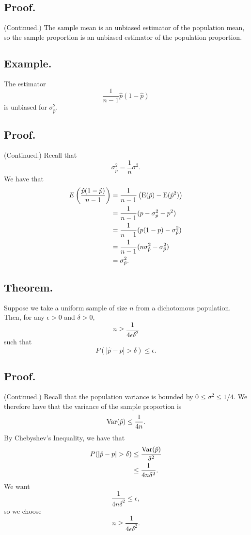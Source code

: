 \documentclass[titlepage]{article}
\begin{document}
\subsection{Proof.} (Continued.) The sample mean is an unbiased estimator of the population mean, so the sample proportion is an unbiased estimator of the population proportion.

\subsection{Example.} The estimator 
$$\frac{1}{n-1}\hat{p}(1-\hat{p})$$
is unbiased for $\sigma_{\hat{p}}^{2}$.

\subsection{Proof.} (Continued.) Recall that 
$$\sigma_{\hat{p}}^{2} = \frac{1}{n}\sigma^{2}.$$
We have that 
\begin{align*}
    E\left(\frac{\hat{p}(1-\hat{p})}{n-1}\right) &= \frac{1}{n-1}\left(\text{E}(\hat{p}) - \text{E}(\hat{p}^{2})\right) \\
                                                 &= \frac{1}{n-1}(p - \sigma_{\hat{p}}^{2} - p^{2}) \\
                                                 &= \frac{1}{n-1}(p(1-p) - \sigma_{\hat{p}}^{2}) \\
                                                 &= \frac{1}{n-1}(n\sigma_{\hat{p}}^{2} - \sigma_{\hat{p}}^{2}) \\
                                                 &= \sigma_{\hat{p}}^{2}.
\end{align*}

\subsection{Theorem.} Suppose we take a uniform sample of size $n$ from a dichotomous population. Then, for any $\epsilon > 0$ and $\delta > 0$, 
$$n \geq \frac{1}{4\epsilon\delta^{2}}$$
such that 
$$P(|\hat{p} - p| > \delta) \leq \epsilon.$$

\subsection{Proof.} (Continued.) Recall that the population variance is bounded by $0 \leq \sigma^{2} \leq 1/4$. We therefore have that the variance of the sample proportion is 
$$\text{Var}(\hat{p}) \leq \frac{1}{4n}.$$
By Chebyshev's Inequality, we have that 
\begin{align*}
    P(|\hat{p} - p| > \delta) &\leq \frac{\text{Var}(\hat{p})}{\delta^{2}} \\
                              &\leq \frac{1}{4n\delta^{2}}.
\end{align*}
We want 
$$\frac{1}{4n\delta^{2}} \leq \epsilon,$$
so we choose 
$$n \geq \frac{1}{4\epsilon\delta^{2}}.$$
\end{document}
